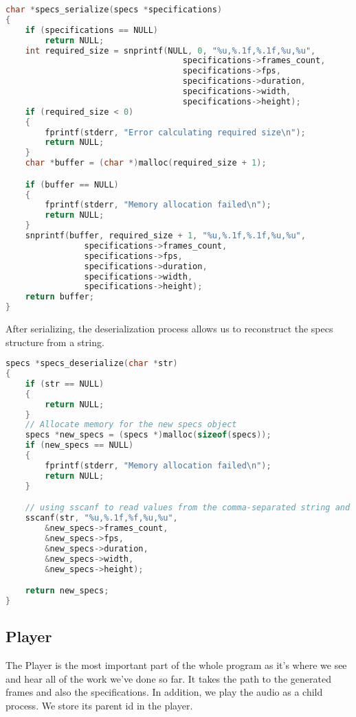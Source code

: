 \documentclass[a4paper,12pt]{article}
\begin{document}
\begin{lstlisting}[language=c]
char *specs_serialize(specs *specifications)
{
    if (specifications == NULL)
        return NULL;
    int required_size = snprintf(NULL, 0, "%u,%.1f,%.1f,%u,%u", 
                                    specifications->frames_count,
                                    specifications->fps,
                                    specifications->duration,
                                    specifications->width,
                                    specifications->height);
    if (required_size < 0)
    {
        fprintf(stderr, "Error calculating required size\n");
        return NULL;
    }
    char *buffer = (char *)malloc(required_size + 1);

    if (buffer == NULL)
    {
        fprintf(stderr, "Memory allocation failed\n");
        return NULL;
    }
    snprintf(buffer, required_size + 1, "%u,%.1f,%.1f,%u,%u", 
                specifications->frames_count,
                specifications->fps,
                specifications->duration,
                specifications->width,
                specifications->height);
    return buffer;
}
\end{lstlisting}
After serializing, the deserialization process allows us to reconstruct the specs structure from a string.

\begin{lstlisting}[language=c]
specs *specs_deserialize(char *str)
{
    if (str == NULL)
    {
        return NULL;
    }
    // Allocate memory for the new specs object
    specs *new_specs = (specs *)malloc(sizeof(specs));
    if (new_specs == NULL)
    {
        fprintf(stderr, "Memory allocation failed\n");
        return NULL;
    }

    // using sscanf to read values from the comma-separated string and store them in the corresponding fields of the specs structure
    sscanf(str, "%u,%.1f,%f,%u,%u",
        &new_specs->frames_count,
        &new_specs->fps,
        &new_specs->duration,
        &new_specs->width,
        &new_specs->height);

    return new_specs;
}
\end{lstlisting}
\subsection{Player}

The Player is the most important part of the whole program as it's where we see and hear all of the work we've done so far.
It takes the path to the generated frames and also the specifications. In addition, we play the audio as a child process. We store its parent id in the player.
\end{document}
